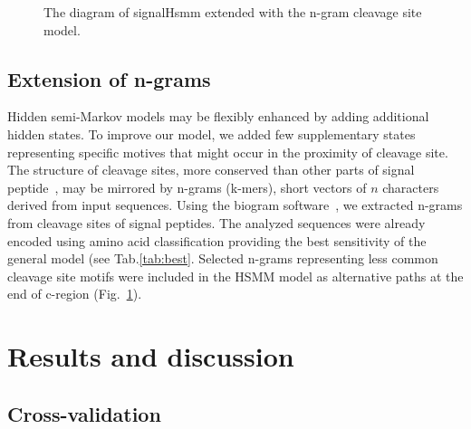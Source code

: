 \documentclass[fleqn,10pt,twoside]{gcb15submission}
\begin{document}
\begin{figure}
\begin{minipage}{.5\linewidth}
{ }
    \caption{The diagram of signalHsmm extended with the n-gram cleavage site model.}
    \label{fig:ngramext}
    \end{minipage}
\end{figure}
    
\subsection*{Extension of n-grams}

Hidden semi-Markov models may be flexibly enhanced by adding additional hidden states. To improve our model, we added few supplementary states representing specific motives that might occur in the proximity of cleavage site. The structure of cleavage sites, more conserved than other parts of signal peptide~\citep{2004hillerpredisi}, may be mirrored by n-grams (k-mers), short vectors of $n$ characters derived from input sequences. Using the biogram software~\citep{biogramPackage}, we extracted n-grams from cleavage sites of signal peptides. The analyzed sequences were already encoded using amino acid classification providing the best sensitivity of the general model (see Tab.\ref{tab:best}. Selected n-grams representing less common cleavage site motifs were included in the HSMM model as alternative paths at the end of c-region (Fig.~\ref{fig:ngramext}).

\section*{Results and discussion}

\subsection*{Cross-validation}
\end{document}
